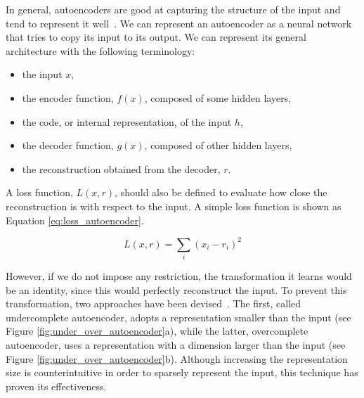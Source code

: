 In general, autoencoders are good at capturing the structure of the input and tend to represent it well~\cite{goodfellow_deep_2016}. We can represent an autoencoder as a neural network that tries to copy its input to its output. We can represent its general architecture with the following terminology:
\begin{itemize}[leftmargin=*,labelsep=5.8mm]
	\item the input $x$,
  \item the {encoder function}, $f(x)$, composed of some hidden layers,
  \item the {code}, or internal representation, of the input $h$,
  \item the {decoder function}, $g(x)$, composed of other hidden layers,
  \item the reconstruction obtained from the decoder, $r$.
\end{itemize}

A {loss function}, $L(x, r)$, should also be defined to evaluate how close the reconstruction is with respect to the input.
A simple loss function is shown as Equation \eqref{eq:loss_autoencoder}.

\begin{equation} \label{eq:loss_autoencoder}
L(x,r) = \sum_{i} (x_i - r_i)^2
\end{equation}

However, if we do not impose any restriction, the transformation it learns would be an identity, since this would perfectly reconstruct the input. To prevent this transformation, two approaches have been devised~\cite{goodfellow_deep_2016}.
The first, called {undercomplete autoencoder}, adopts a representation smaller than the input (see Figure \ref{fig:under_over_autoencoder}a),
while the latter, {overcomplete autoencoder}, uses a representation with a dimension larger than the input (see Figure \ref{fig:under_over_autoencoder}b).
Although increasing the representation size is counterintuitive in order to sparsely represent the input, this technique has proven its effectiveness.

